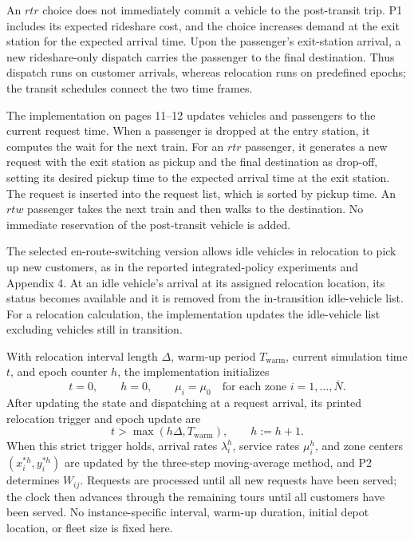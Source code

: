 \documentclass{article}
\begin{document}
An $rtr$ choice does not immediately commit a vehicle to the post-transit trip. P1 includes its expected rideshare cost, and the choice increases demand at the exit station for the expected arrival time. Upon the passenger's exit-station arrival, a new rideshare-only dispatch carries the passenger to the final destination. Thus dispatch runs on customer arrivals, whereas relocation runs on predefined epochs; the transit schedules connect the two time frames.

The implementation on pages 11--12 updates vehicles and passengers to the current request time. When a passenger is dropped at the entry station, it computes the wait for the next train. For an $rtr$ passenger, it generates a new request with the exit station as pickup and the final destination as drop-off, setting its desired pickup time to the expected arrival time at the exit station. The request is inserted into the request list, which is sorted by pickup time. An $rtw$ passenger takes the next train and then walks to the destination. No immediate reservation of the post-transit vehicle is added.

The selected en-route-switching version allows idle vehicles in relocation to pick up new customers, as in the reported integrated-policy experiments and Appendix 4. At an idle vehicle's arrival at its assigned relocation location, its status becomes available and it is removed from the in-transition idle-vehicle list. For a relocation calculation, the implementation updates the idle-vehicle list excluding vehicles still in transition.

With relocation interval length $\Delta$, warm-up period $T_{\mathrm{warm}}$, current simulation time $t$, and epoch counter $h$, the implementation initializes
\[
t=0,\qquad h=0,\qquad
\mu_i=\mu_0\quad\text{for each zone }i=1,\ldots,\bar N.
\]
After updating the state and dispatching at a request arrival, its printed relocation trigger and epoch update are
\[
t>\max(h\Delta,T_{\mathrm{warm}}),\qquad h:=h+1.
\]
When this strict trigger holds, arrival rates $\lambda_i^h$, service rates $\mu_i^h$, and zone centers $(x_i^{*h},y_i^{*h})$ are updated by the three-step moving-average method, and P2 determines $W_{ij}$. Requests are processed until all new requests have been served; the clock then advances through the remaining tours until all customers have been served. No instance-specific interval, warm-up duration, initial depot location, or fleet size is fixed here.
\end{document}
